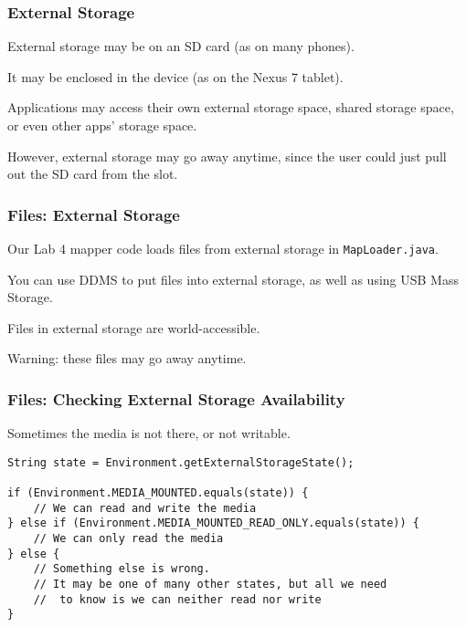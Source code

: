 \begin{frame}
\frametitle{External Storage}
\begin{changemargin}{1cm}

External storage may be on an SD card (as on many phones).

It may be
enclosed in the device (as on the Nexus 7 tablet). 

Applications may access
their own external storage space, shared storage space, or even other
apps' storage space. 

However, external storage may go away anytime, since
the user could just pull out the SD card from the slot.

\end{changemargin}
\end{frame}

\begin{frame}
\frametitle{Files: External Storage}

\begin{changemargin}{1cm}
Our Lab 4 mapper code loads files from external storage in {\tt MapLoader.java}.

You can use DDMS to put files into external storage,
as well as using USB Mass Storage.

Files in external storage are world-accessible.

Warning: these files may go away anytime.
\end{changemargin}
\end{frame}

\begin{frame}[fragile]
\frametitle{Files: Checking External Storage Availability}

\begin{changemargin}{1cm}
Sometimes the media is not there, or not writable.
{\scriptsize
\begin{verbatim}
String state = Environment.getExternalStorageState();

if (Environment.MEDIA_MOUNTED.equals(state)) {
    // We can read and write the media
} else if (Environment.MEDIA_MOUNTED_READ_ONLY.equals(state)) {
    // We can only read the media
} else {
    // Something else is wrong. 
    // It may be one of many other states, but all we need
    //  to know is we can neither read nor write
}
\end{verbatim}
}
\end{changemargin}
\end{frame}

